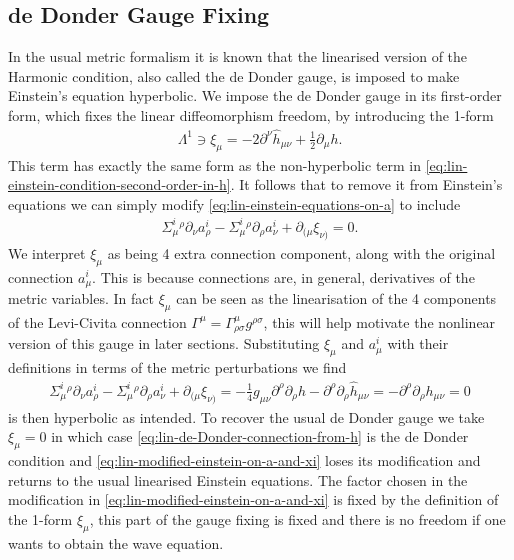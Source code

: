 \documentclass[10pt]{report}
\theoremstyle{definition}
\begin{document}
        \subsection{de Donder Gauge Fixing}
        In the usual metric formalism it is known that the linearised version of the Harmonic condition, also called the de Donder gauge, is imposed to make Einstein's equation hyperbolic. We impose the de Donder gauge in its first-order form, which fixes the linear diffeomorphism freedom, by introducing the 1-form
        \begin{align}
            \Lambda^1 \ni \xi_\mu = -2 \partial^\nu \hat{h}_{\mu\nu} + \frac{1}{2}\partial_\mu h.\label{eq:lin-de-Donder-connection-from-h}
        \end{align}
        This term has exactly the same form as the non-hyperbolic term in \cref{eq:lin-einstein-condition-second-order-in-h}. It follows that to remove it from Einstein's equations we can simply modify \cref{eq:lin-einstein-equations-on-a} to include
        \begin{align}
            \Sigma^i_\mu{}^\rho \partial_\nu a^i_\rho - \Sigma^i_\mu{}^\rho \partial_\rho a^i_\nu + \partial_{(\mu} \xi_{\nu)} = 0. \label{eq:lin-modified-einstein-on-a-and-xi}
        \end{align}
        We interpret $\xi_\mu$ as being 4 extra connection component, along with the original connection $a^i_\mu$. This is because connections are, in general, derivatives of the metric variables. In fact $\xi_\mu$ can be seen as the linearisation of the 4 components of the Levi-Civita connection $\Gamma^\mu = \Gamma^\mu_{\rho\sigma} g^{\rho\sigma}$, this will help motivate the nonlinear version of this gauge in later sections. Substituting $\xi_\mu$ and $a^i_\mu$ with their definitions in terms of the metric perturbations we find
        \begin{align}
            \Sigma^i_\mu{}^\rho \partial_\nu a^i_\rho - \Sigma^i_\mu{}^\rho \partial_\rho a^i_\nu + \partial_{(\mu} \xi_{\nu)} = -\frac{1}{4} g_{\mu\nu} \partial^\rho \partial_\rho h - \partial^\rho \partial_\rho \hat{h}_{\mu\nu} = - \partial^\rho \partial_\rho h_{\mu\nu} = 0
        \end{align}
        is then hyperbolic as intended. To recover the usual de Donder gauge we take $\xi_\mu = 0$ in which case \cref{eq:lin-de-Donder-connection-from-h} is the de Donder condition and \cref{eq:lin-modified-einstein-on-a-and-xi} loses its modification and returns to the usual linearised Einstein equations. The factor chosen in the modification in \cref{eq:lin-modified-einstein-on-a-and-xi} is fixed by the definition of the 1-form $\xi_\mu$, this part of the gauge fixing is fixed and there is no freedom if one wants to obtain the wave equation.
\end{document}
